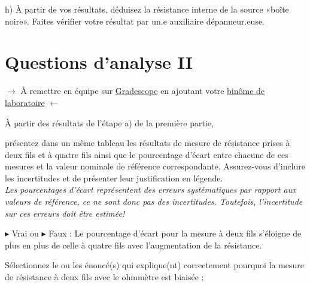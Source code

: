 \documentclass[canadien,12pt,oneside,letterpaper]{article}
\begin{document}
h) À partir de vos résultats, déduisez la résistance interne de la source «boîte noire». Faites vérifier votre résultat par un.e auxiliaire dépanneur.euse.


\section{Questions d'analyse II} \label{sec:grade}
\vspace{-0.5cm}
\noindent$\rightarrow$ À remettre en équipe sur \href{https://www.gradescope.com/}{Gradescope} en ajoutant votre \href{https://help.gradescope.com/article/m5qz2xsnjy-student-add-group-members}{binôme de laboratoire} $\leftarrow$

\begin{gradescope}
\item À partir des résultats de l'étape a) de la première partie,
    \begin{gradescope}
    \item présentez dans un même tableau les résultats de mesure de résistance prises à deux fils et à quatre fils ainsi que le pourcentage d'écart entre chacune de ces mesures et la valeur nominale de référence correspondante. Assurez-vous d'inclure les incertitudes et de présenter leur justification en légende.\\\textit{\footnotesize Les pourcentages d'écart représentent des erreurs systématiques par rapport aux valeurs de référence, ce ne sont donc pas des incertitudes. Toutefois, l'incertitude sur ces erreurs doit être estimée!}
    \item $\blacktriangleright$ Vrai ou $\blacktriangleright$ Faux : Le pourcentage d'écart pour la mesure à deux fils s'éloigne de plus en plus de celle à quatre fils avec l'augmentation de la résistance.
    \item Sélectionnez le ou les énoncé(s) qui explique(nt) correctement pourquoi la mesure de résistance à deux fils avec le ohmmètre est biaisée :
    \begin{itemize}[label=$\blacktriangleright$]

\end{itemize}
\end{gradescope}
\end{gradescope}
\end{document}

